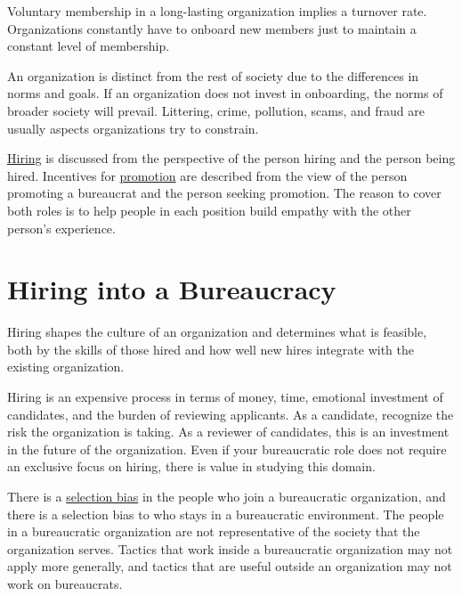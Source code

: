 

Voluntary membership in a long-lasting organization implies a turnover rate. Organizations constantly have to onboard new members just to maintain a constant level of membership.

An organization is distinct from the rest of society due to the differences in norms and goals. If an organization does not invest in onboarding, the norms of broader society will prevail. Littering, crime, pollution, scams, and fraud are usually aspects organizations try to constrain.

\hyperref[sec:hiring]{Hiring}\iftoggle{haspagenumbers}{ (see page~\pageref{sec:hiring})}{}
is discussed from the perspective of the person hiring and the person being hired. 
Incentives for \hyperref[sec:promotion]{promotion}\iftoggle{haspagenumbers}{ (see page~\pageref{sec:promotion})}{}
are described from the view of the person promoting a bureaucrat and the person seeking promotion. 
The reason to cover both roles is to help people in each position build empathy with the other person's experience. 


\section{Hiring into a Bureaucracy\label{sec:hiring}}


Hiring shapes the culture of an organization and determines what is feasible, both by the skills of those hired and how well new hires integrate with the existing organization. 

Hiring is an expensive process in terms of money, time, emotional investment of candidates, and the burden of reviewing applicants. 
As a candidate, recognize the risk the organization is taking. 
As a reviewer of candidates, this is an investment in the future of the organization. Even if your bureaucratic role does not require an exclusive focus on hiring, there is value in studying this domain. 

There is a \href{https://en.wikipedia.org/wiki/Selection_bias}{selection bias} in
the people who join a bureaucratic organization, and there is a selection bias to who stays in a bureaucratic environment. 
The people in a bureaucratic organization are not representative of the society that the organization serves. Tactics that work inside a bureaucratic organization may not apply more generally, and tactics that are useful outside an organization may not work on bureaucrats. 


